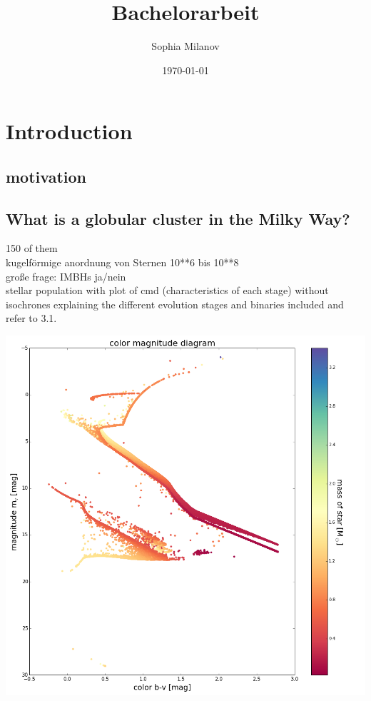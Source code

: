 \documentclass[a4paper,12pt,abstracton]{scrartcl}
\title{Bachelorarbeit}
\author{Sophia Milanov}
\date{\today}
\begin{document}


\begin{abstract}
\blindtext 
\end{abstract}

\newpage

\tableofcontents

\newpage
\section{Introduction}
\subsection{motivation}
\subsection{What is a globular cluster in the Milky Way?}
150 of them \\
kugelförmige anordnung von Sternen 10**6 bis 10**8\\
große frage: IMBHs ja/nein\\
stellar population with plot of cmd (characteristics of each stage) without isochrones explaining the different evolution stages and binaries included and refer to 3.1.

\includegraphics[width=\textwidth]{Plots/color_magnitude_diagram}
\end{document}
